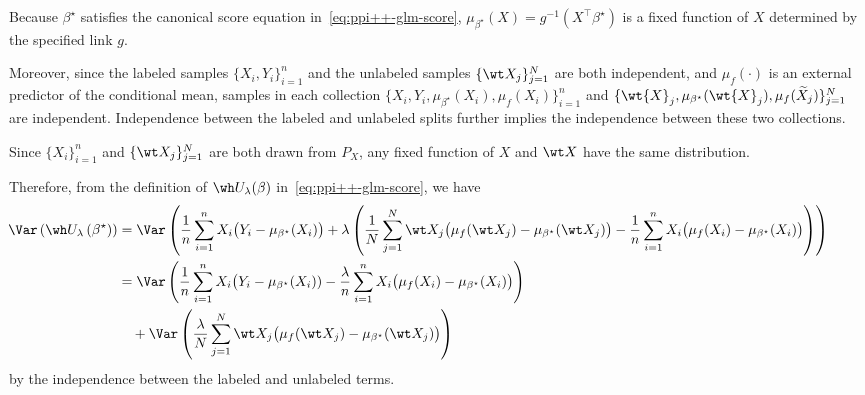 \noindent
Because $\beta^\star$ satisfies the canonical score equation in~\eqref{eq:ppi++-glm-score}, $\mu_{\beta^\star}(X)=g^{-1}(X^\top\beta^\star)$ is a fixed function of $X$ determined by the specified link $g$. 

\noindent
Moreover, since the labeled samples $\{X_i,Y_i\}_{i=1}^n$ and the unlabeled samples $\{\wt X_j\}_{j=1}^N$ are both independent, and $\mu_f(\cdot)$ is an external predictor of the conditional mean, samples in each collection
$\{X_i, Y_i, \mu_{\beta^\star}(X_i), \mu_f(X_i)\}_{i=1}^n$
and 
$\{\wt{X}_j, \mu_{\beta^\star}(\wt{X}_j), \mu_f(\widetilde{X}_j)\}_{j=1}^N$
are independent. Independence between the labeled and unlabeled splits further implies the independence between these two collections. 

\noindent
Since $\{X_i\}_{i=1}^n$ and $\{\wt X_j\}_{j=1}^N$ are both drawn from $P_X$, any fixed function of $X$ and $\wt X$ have the same distribution.

\noindent
Therefore, from the definition of $\wh U_{\lambda}(\beta)$ in~\eqref{eq:ppi++-glm-score}, we have
\begin{align*}
    \hspace{-3em}\Var\left(\wh U_\lambda\left(\beta^\star\right)\right)
    &=\Var\left(\frac{1}{n}\sum_{i=1}^n X_i\big(Y_i-\mu_{\beta^\star}(X_i)\big)
    +\lambda\left(\frac{1}{N}\sum_{j=1}^N \wt X_j\big(\mu_f(\wt X_j)-\mu_{\beta^\star}(\wt X_j)\big)
    -\frac{1}{n}\sum_{i=1}^n X_i\big(\mu_f(X_i)-\mu_{\beta^\star}(X_i)\big)\right)\right)\\
    &=\Var\left(\frac{1}{n}\sum_{i=1}^n X_i\big(Y_i-\mu_{\beta^\star}(X_i))-\frac{\lambda}{n}\sum_{i=1}^n X_i\big(\mu_f(X_i)-\mu_{\beta^\star}(X_i)\big)\right)\\
    &\quad+\Var\left(\frac{\lambda}{N}\sum_{j=1}^N \wt X_j\big(\mu_f(\wt X_j)-\mu_{\beta^\star}(\wt X_j)\big)\right)
\end{align*} by the independence between the labeled and unlabeled terms.

